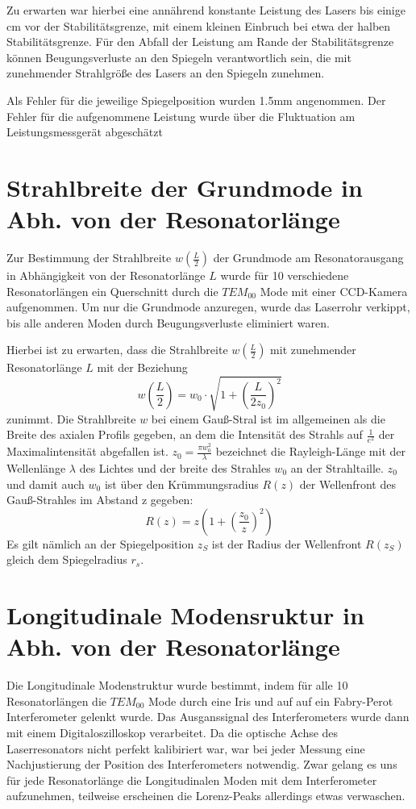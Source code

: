 \documentclass[bigchapter,colorback,accentcolor=tud4b,linedtoc,11pt]{tudreport}
\numberwithin{equation}{subsection}
\begin{document}
Zu erwarten war hierbei eine annährend konstante Leistung des Lasers bis einige cm vor der Stabilitätsgrenze, mit einem kleinen Einbruch bei etwa der halben Stabilitätsgrenze.
Für den Abfall der Leistung am Rande der Stabilitätsgrenze können Beugungsverluste an den Spiegeln verantwortlich sein, die mit zunehmender Strahlgröße des Lasers an den Spiegeln zunehmen.

Als Fehler für die jeweilige Spiegelposition wurden 1.5mm angenommen. Der Fehler für die aufgenommene Leistung wurde über die Fluktuation am Leistungsmessgerät abgeschätzt

\FloatBarrier
\section{Strahlbreite der Grundmode in Abh. von der Resonatorlänge}
Zur Bestimmung der Strahlbreite \(w\left(\frac{L}{2}\right)\) der Grundmode am Resonatorausgang in Abhängigkeit von der Resonatorlänge \(L\) wurde für 10 verschiedene Resonatorlängen ein Querschnitt durch die $TEM_{00}$ Mode mit einer CCD-Kamera aufgenommen. Um nur die Grundmode anzuregen, wurde das Laserrohr verkippt, bis alle anderen Moden durch Beugungsverluste eliminiert waren.

Hierbei ist zu erwarten, dass die Strahlbreite $w\left(\frac{L}{2}\right)$ mit zunehmender Resonatorlänge \(L\) mit der Beziehung 
$$w\left(\frac{L}{2}\right)=w_0\cdot\sqrt{1+\left({\frac{L}{2 z_0}}\right)^2}$$
zunimmt. Die Strahlbreite \(w\) bei einem Gauß-Stral ist im allgemeinen als die Breite des axialen Profils gegeben, an dem die Intensität des Strahls auf $\frac{1}{e^2}$ der Maximalintensität abgefallen ist. \(z_0=\frac{\pi w_0^2}{\lambda}\) bezeichnet die Rayleigh-Länge mit der Wellenlänge \(\lambda\) des Lichtes und der breite des Strahles \(w_0\) an der Strahltaille. \(z_0\) und damit auch \(w_0\) ist über den Krümmungsradius $R(z)$ der Wellenfront des Gauß-Strahles im Abstand z gegeben:
$$R(z) = z \left(1+\left(\frac{z_0}{z}\right)^2\right)$$
Es gilt nämlich an der Spiegelposition \(z_S\) ist der Radius der Wellenfront \(R(z_S)\) gleich dem Spiegelradius \(r_s\).


\FloatBarrier
\section{Longitudinale Modensruktur in Abh. von der Resonatorlänge}
Die Longitudinale Modenstruktur wurde bestimmt, indem für alle 10 Resonatorlängen die $TEM_{00}$ Mode durch eine Iris und auf auf ein Fabry-Perot Interferometer gelenkt wurde. Das Ausganssignal des Interferometers wurde dann mit einem Digitaloszilloskop verarbeitet.
Da die optische Achse des Laserresonators nicht perfekt kalibiriert war, war bei jeder Messung eine Nachjustierung der Position des Interferometers notwendig. Zwar gelang es uns für jede Resonatorlänge die Longitudinalen Moden mit dem Interferometer aufzunehmen, teilweise erscheinen die Lorenz-Peaks allerdings etwas verwaschen.
\end{document}
